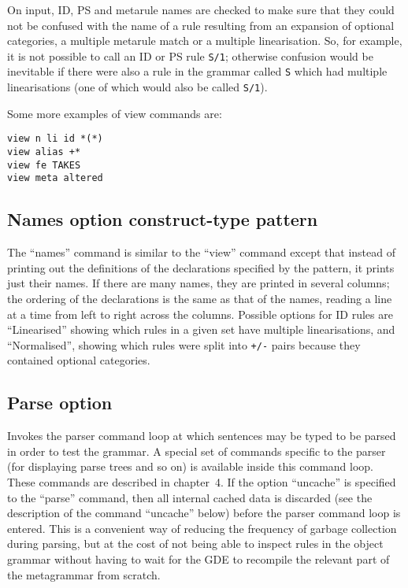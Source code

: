 On input, ID, PS and metarule names are checked to make sure that they
could not be confused with the name of a rule resulting from an
expansion of optional categories, a multiple metarule match or a multiple
linearisation. So, for example, it is not possible to call an ID or PS rule
{\tt S/1}; otherwise confusion would be inevitable if there were also a
rule in the grammar called {\tt S} which had multiple linearisations
(one of which would also be called {\tt S/1}).

Some more examples of view commands are:
\begin{ex}
\begin{verbatim}
view n li id *(*)
view alias +*
view fe TAKES
view meta altered
\end{verbatim}
\end{ex}

\subsection{Names option construct-type pattern}

The ``names'' command is similar to the ``view'' command except that instead
of printing out the definitions of the declarations specified by
the pattern, it prints just their names. If there are many names, they
are printed in several columns; the ordering of the declarations
is the same as that of the names, reading a line at a time from left to
right across the columns.  Possible options for ID rules are
``Linearised'' showing which rules in a given set have multiple
linearisations, and ``Normalised'', showing which rules were split into
{\tt +/-} pairs because they contained optional categories.

\subsection{Parse option}

Invokes the parser command loop at which sentences may be typed to be parsed
in order to test the grammar. A special set of commands specific to the
parser (for displaying parse trees and so on) is available inside this
command loop. These commands are described in chapter~4. If the option
``uncache'' is specified to the ``parse'' command, then all internal cached
data is discarded (see the description of the command ``uncache'' below)
before the parser command loop is entered. This is a convenient way of
reducing the frequency of garbage collection during parsing, but at the
cost of not being able to inspect rules in the object grammar without
having to wait for the GDE to recompile the relevant part of the
metagrammar from scratch.

